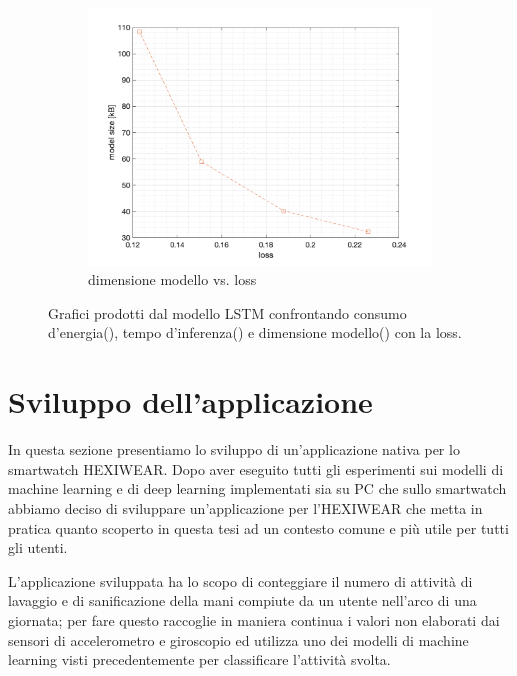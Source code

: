\begin{figure}[!htb]
\begin{subfigure}{.45\textwidth}
        \includegraphics[width=\textwidth]{figure/lstm_size_loss.png}
        \caption{dimensione modello vs. loss}
        \label{fig:performance-lstm-hexi:lstm-size-loss}
    \end{subfigure}
    \caption{Grafici prodotti dal modello LSTM confrontando consumo d'energia(), tempo d'inferenza() e dimensione modello() con la loss.}
    \label{fig:performance-lstm-hexi}
\end{figure}

\section{Sviluppo dell'applicazione}
\label{sec:sviluppo-dell-applicazione}

In questa sezione presentiamo lo sviluppo di un'applicazione nativa per lo smartwatch HEXIWEAR. Dopo aver eseguito tutti gli esperimenti sui modelli di machine learning e di deep learning implementati sia su PC che sullo smartwatch abbiamo deciso di sviluppare un'applicazione per l'HEXIWEAR che metta in pratica quanto scoperto in questa tesi ad un contesto comune e più utile per tutti gli utenti. 

L'applicazione sviluppata ha lo scopo di conteggiare il numero di attività di lavaggio e di sanificazione della mani compiute da un utente nell'arco di una giornata; per fare questo raccoglie in maniera continua i valori non elaborati dai sensori di accelerometro e giroscopio ed utilizza uno dei modelli di machine learning visti precedentemente per classificare l'attività svolta. 

